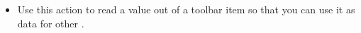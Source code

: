 
\begin{itemize}
\item Use this action to read a value out of a toolbar item so that you can use it as data for other \gdsteps{}. 
\end{itemize}

